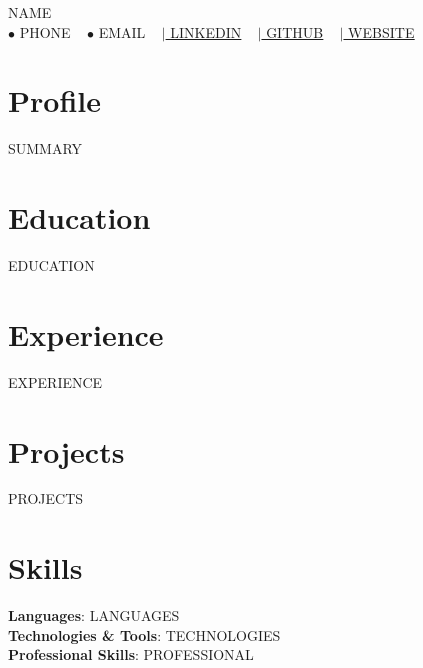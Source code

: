 \documentclass[a4paper,10pt]{article}
\newcommand{\resumeSubHeadingListStart}{\begin{itemize}[leftmargin=0.0in, label={}]}
\newcommand{\resumeSubHeadingListEnd}{\end{itemize}}
\begin{document}
\begin{center}
    {\Huge \scshape {{NAME}}} \\ \vspace{5pt}
    \small $\bullet$ {{PHONE}} ~
    \small $\bullet$ {{EMAIL}} ~
    \href{https://{{LINKEDIN}}}{\small $|$ \underline{{{LINKEDIN}}}} ~
    \href{https://{{GITHUB}}}{\small $|$ \underline{{{GITHUB}}}} ~
    \href{https://{{WEBSITE}}}{\small $|$ \underline{{{WEBSITE}}}}
    \vspace{-6pt}
\end{center}

\section{Profile}
\small{{{SUMMARY}}}
\vspace{-6pt}

\section{Education}
  \resumeSubHeadingListStart
{{EDUCATION}}
  \resumeSubHeadingListEnd
\vspace{-6pt}

\section{Experience}
  \vspace{-4pt}
    \resumeSubHeadingListStart
{{EXPERIENCE}}
    \resumeSubHeadingListEnd
\vspace{-8pt}

\section{Projects}
    \vspace{-4pt}
    \resumeSubHeadingListStart
{{PROJECTS}}
    \resumeSubHeadingListEnd
\vspace{-8pt}

\section{Skills}
 \begin{itemize}[leftmargin=0.15in, label={}]
    \small{\item{
     \textbf{Languages}{: {{LANGUAGES}}} \\
     \textbf{Technologies \& Tools}{: {{TECHNOLOGIES}}} \\
     \textbf{Professional Skills}{: {{PROFESSIONAL}}} \\
    }}
 \end{itemize}
 \vspace{-12pt}
\end{document}
